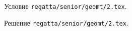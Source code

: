 Условие \texttt{regatta/senior/geomt/2.tex}.

\solution Решение \texttt{regatta/senior/geomt/2.tex}.
